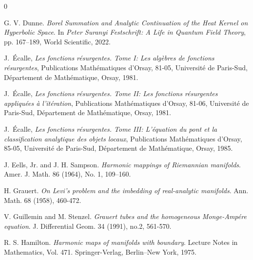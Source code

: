 \documentclass[11pt]{amsart}
\theoremstyle{plain}
\theoremstyle{definition}
\begin{document}
\begin{thebibliography}{0}




 G. V. Dunne.
\textit{Borel Summation and Analytic Continuation of the Heat Kernel on Hyperbolic Space}.
In \textit{Peter Suranyi Festschrift: A Life in Quantum Field Theory}, pp. 167--189, World Scientific, 2022.


J.~Écalle,
\textit{Les fonctions résurgentes. Tome I: Les algèbres de fonctions résurgentes},
Publications Mathématiques d'Orsay, 81-05,
Université de Paris-Sud, Département de Mathématique, Orsay, 1981.


J.~Écalle,
\textit{Les fonctions résurgentes. Tome II: Les fonctions résurgentes appliquées à l'itération},
Publications Mathématiques d'Orsay, 81-06,
Université de Paris-Sud, Département de Mathématique, Orsay, 1981.



J.~Écalle,
\textit{Les fonctions résurgentes. Tome III: L'équation du pont et la classification analytique des objets locaux},
Publications Mathématiques d'Orsay, 85-05,
Université de Paris-Sud, Département de Mathématique, Orsay, 1985.


 J. Eells, Jr. and J. H. Sampson.
\textit{Harmonic mappings of Riemannian manifolds}.
Amer. J. Math. 86 (1964), No. 1, 109--160.




 H. Grauert.
\textit{On Levi's problem and the imbedding of real-analytic manifolds}.
Ann. Math. 68 (1958), 460-472.


 V. Guillemin and M. Stenzel.
\textit{Grauert tubes and the homogeneous Monge-Amp\'ere equation}.
J. Differential Geom. 34 (1991), no.2, 561-570.




 R. S. Hamilton.
\textit{Harmonic maps of manifolds with boundary}.
Lecture Notes in Mathematics, Vol. 471. Springer-Verlag, Berlin--New York, 1975.



\end{thebibliography}
\end{document}
